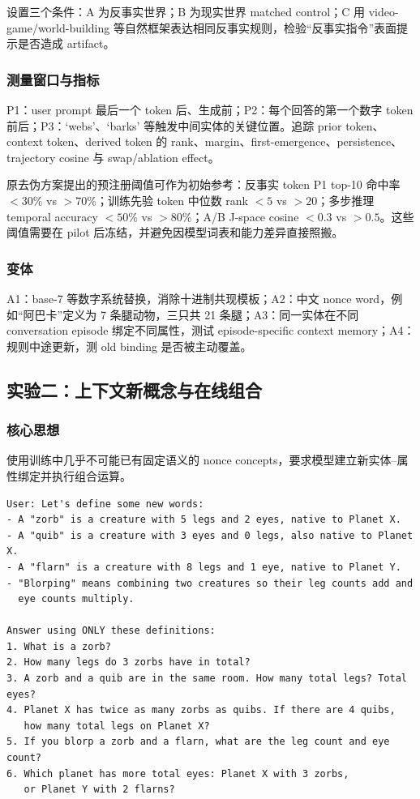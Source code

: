 \documentclass[10.5pt,a4paper]{ctexart}
\begin{document}
设置三个条件：A 为反事实世界；B 为现实世界 matched control；C 用 video-game/world-building 等自然框架表达相同反事实规则，检验“反事实指令”表面提示是否造成 artifact。

\subsubsection{测量窗口与指标}
P1：user prompt 最后一个 token 后、生成前；P2：每个回答的第一个数字 token 前后；P3：`webs'、`barks' 等触发中间实体的关键位置。追踪 prior token、context token、derived token 的 rank、margin、first-emergence、persistence、trajectory cosine 与 swap/ablation effect。

原去伪方案提出的预注册阈值可作为初始参考：反事实 token P1 top-10 命中率 $<30\%$ vs $>70\%$；训练先验 token 中位数 rank $<5$ vs $>20$；多步推理 temporal accuracy $<50\%$ vs $>80\%$；A/B J-space cosine $<0.3$ vs $>0.5$。这些阈值需要在 pilot 后冻结，并避免因模型词表和能力差异直接照搬。

\subsubsection{变体}
A1：base-7 等数字系统替换，消除十进制共现模板；A2：中文 nonce word，例如“阿巴卡”定义为 7 条腿动物，三只共 21 条腿；A3：同一实体在不同 conversation episode 绑定不同属性，测试 episode-specific context memory；A4：规则中途更新，测 old binding 是否被主动覆盖。

\subsection{实验二：上下文新概念与在线组合}
\subsubsection{核心思想}
使用训练中几乎不可能已有固定语义的 nonce concepts，要求模型建立新实体--属性绑定并执行组合运算。

\begin{lstlisting}
User: Let's define some new words:
- A "zorb" is a creature with 5 legs and 2 eyes, native to Planet X.
- A "quib" is a creature with 3 eyes and 0 legs, also native to Planet X.
- A "flarn" is a creature with 8 legs and 1 eye, native to Planet Y.
- "Blorping" means combining two creatures so their leg counts add and
  eye counts multiply.

Answer using ONLY these definitions:
1. What is a zorb?
2. How many legs do 3 zorbs have in total?
3. A zorb and a quib are in the same room. How many total legs? Total eyes?
4. Planet X has twice as many zorbs as quibs. If there are 4 quibs,
   how many total legs on Planet X?
5. If you blorp a zorb and a flarn, what are the leg count and eye count?
6. Which planet has more total eyes: Planet X with 3 zorbs,
   or Planet Y with 2 flarns?
\end{lstlisting}
\end{document}
